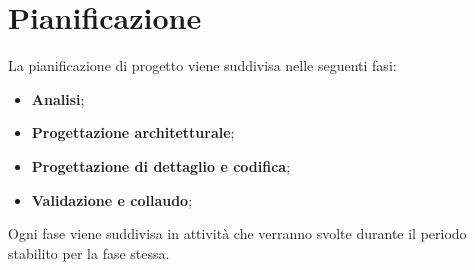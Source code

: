 \section{Pianificazione}
La pianificazione di progetto viene suddivisa nelle seguenti fasi:
\begin{itemize}
	\item \textbf{Analisi};
	\item \textbf{Progettazione architetturale};
	\item \textbf{Progettazione di dettaglio e codifica};
	\item \textbf{Validazione e collaudo};
\end{itemize}
Ogni fase viene suddivisa in attività che verranno svolte durante il periodo stabilito per la fase stessa.

\newpage

\newpage

\newpage
